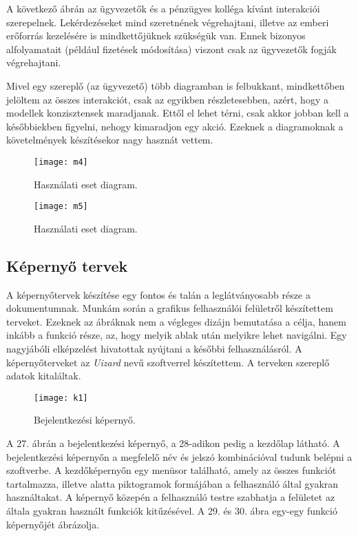 \documentclass[12pt]{article}
\begin{document}
A következő ábrán az ügyvezetők és a pénzügyes kolléga kívánt interakciói szerepelnek. Lekérdezéseket mind szeretnének végrehajtani, illetve az emberi erőforrás kezelésére is mindkettőjüknek szükségük van. Ennek bizonyos alfolyamatait (például fizetések módosítása) viszont csak az ügyvezetők fogják végrehajtani.

 Mivel egy szereplő (az ügyvezető) több diagramban is felbukkant, mindkettőben jelöltem az összes interakciót, csak az egyikben részletesebben, azért, hogy a modellek konzisztensek maradjanak. Ettől el lehet térni, csak akkor jobban kell a későbbiekben figyelni, nehogy kimaradjon egy akció. Ezeknek a diagramoknak a követelmények készítésekor nagy hasznát vettem.

\begin{figure}
\texttt{[image: m4]}
\caption{Használati eset diagram.}
\end{figure}

\begin{figure}
\texttt{[image: m5]}
\caption{Használati eset diagram.}
\end{figure}


\newpage
\subsection{ Képernyő tervek}

A képernyőtervek készítése egy fontos és talán a leglátványosabb része a dokumentumnak. Munkám során a grafikus felhasználói felületről készítettem terveket. Ezeknek az ábráknak nem a végleges dizájn bemutatása a célja, hanem inkább a funkció része, az, hogy melyik ablak után melyikre lehet navigálni. Egy nagyjábóli elképzelést hivatottak nyújtani a későbbi felhasználásról. A képernyőterveket az \textit{Uizard} nevű szoftverrel készítettem. A terveken szereplő adatok kitaláltak.

\begin{figure}
\texttt{[image: k1]}
\caption{Bejelentkezési képernyő.}
\end{figure}

A 27. ábrán a bejelentkezési képernyő, a 28-adikon pedig a kezdőlap látható. A bejelentkezési képernyőn a megfelelő név és jelszó kombinációval tudunk belépni a szoftverbe. A kezdőképernyőn egy menüsor található, amely az összes funkciót tartalmazza, illetve alatta piktogramok formájában a felhasználó által gyakran használtakat. A képernyő közepén a felhasználó testre szabhatja a felületet az általa gyakran használt funkciók kitűzésével. A 29. és 30. ábra egy-egy funkció képernyőjét ábrázolja.
\end{document}
